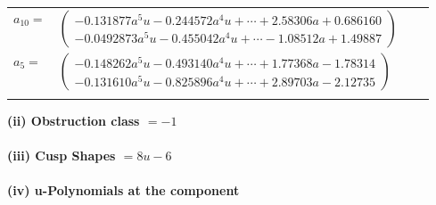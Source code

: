 \documentclass[1p]{elsarticle_modified}
\theoremstyle{definition}
\begin{document}
\begin{tabular}{m{7pt} m{180pt} m{7pt} m{180pt} }
\flushright $a_{10}=$&$\begin{pmatrix}-0.131877 a^{5} u-0.244572 a^{4} u+\cdots+2.58306 a+0.686160\\-0.0492873 a^{5} u-0.455042 a^{4} u+\cdots-1.08512 a+1.49887\end{pmatrix}$ \\
\flushright $a_{5}=$&$\begin{pmatrix}-0.148262 a^{5} u-0.493140 a^{4} u+\cdots+1.77368 a-1.78314\\-0.131610 a^{5} u-0.825896 a^{4} u+\cdots+2.89703 a-2.12735\end{pmatrix}$\\&\end{tabular}
\flushleft \textbf{(ii) Obstruction class $= -1$}\\~\\
\flushleft \textbf{(iii) Cusp Shapes $= 8 u-6$}\\~\\
\newpage\renewcommand{\arraystretch}{1}
\flushleft \textbf{(iv) u-Polynomials at the component}\newline \\
\end{document}
